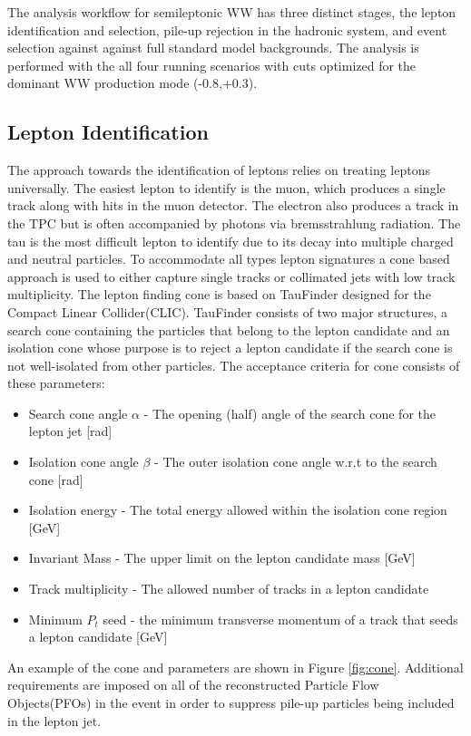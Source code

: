 The analysis workflow for semileptonic WW has three distinct stages, the lepton identification and selection, pile-up rejection in the hadronic system, and event selection against against full standard model backgrounds. The analysis is performed with the all four running scenarios with cuts optimized for the dominant WW production mode (-0.8,+0.3). 


\subsection{Lepton Identification}
\label{subsec:Lepton_ID}
The approach towards the identification of leptons relies on treating leptons universally. The easiest lepton to identify is the muon, which produces a single track along with hits in the muon detector. The electron also produces a track in the TPC but is often accompanied by photons via bremsstrahlung radiation. The tau is the most difficult lepton to identify due to its decay into multiple charged and neutral particles. To accommodate all types lepton signatures a cone based approach is used to either capture single tracks or collimated jets with low track multiplicity. The lepton finding cone is based on TauFinder \cite{taufinder} designed for the Compact Linear Collider(CLIC). TauFinder consists of two major structures, a search cone containing the particles that belong to the lepton candidate and an isolation cone whose purpose is to reject a lepton candidate if the search cone is not well-isolated from other particles. The acceptance criteria for cone consists of these parameters:
\begin{itemize}
\item Search cone angle $\alpha$ - The opening (half) angle of the search cone for the lepton jet [rad]
\item Isolation cone angle $\beta$ - The outer isolation cone angle w.r.t to the search cone [rad]
\item Isolation energy - The total energy allowed within the isolation cone region [GeV]
\item Invariant Mass - The upper limit on the lepton candidate mass [GeV]
\item Track multiplicity - The allowed number of tracks in a lepton candidate
\item Minimum $P_t$ seed - the minimum transverse momentum of a track that seeds a lepton candidate [GeV] 
\end{itemize}
An example of the cone and parameters are shown in Figure \ref{fig:cone}. Additional requirements are imposed on all of the reconstructed Particle Flow Objects(PFOs) in the event in order to suppress pile-up particles being included in the lepton jet.

